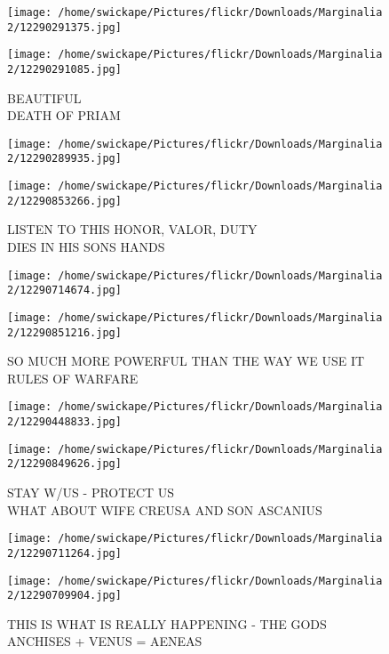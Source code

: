 \documentclass[10pt,letterpaper]{article}
\begin{document}
\texttt{[image: /home/swickape/Pictures/flickr/Downloads/Marginalia 2/12290291375.jpg]}

\vspace{0.25in}
\texttt{[image: /home/swickape/Pictures/flickr/Downloads/Marginalia 2/12290291085.jpg]}

BEAUTIFUL\\
DEATH OF PRIAM\\
\pagebreak

\texttt{[image: /home/swickape/Pictures/flickr/Downloads/Marginalia 2/12290289935.jpg]}

\vspace{0.25in}
\texttt{[image: /home/swickape/Pictures/flickr/Downloads/Marginalia 2/12290853266.jpg]}

LISTEN TO THIS HONOR, VALOR, DUTY\\
DIES IN HIS SONS HANDS\\
\pagebreak

\texttt{[image: /home/swickape/Pictures/flickr/Downloads/Marginalia 2/12290714674.jpg]}

\vspace{0.25in}
\texttt{[image: /home/swickape/Pictures/flickr/Downloads/Marginalia 2/12290851216.jpg]}

SO MUCH MORE POWERFUL THAN THE WAY WE USE IT\\
RULES OF WARFARE\\
\pagebreak

\texttt{[image: /home/swickape/Pictures/flickr/Downloads/Marginalia 2/12290448833.jpg]}

\vspace{0.25in}
\texttt{[image: /home/swickape/Pictures/flickr/Downloads/Marginalia 2/12290849626.jpg]}

STAY W/US {-} PROTECT US\\
WHAT ABOUT WIFE CREUSA AND SON ASCANIUS\\
\pagebreak

\texttt{[image: /home/swickape/Pictures/flickr/Downloads/Marginalia 2/12290711264.jpg]}

\vspace{0.25in}
\texttt{[image: /home/swickape/Pictures/flickr/Downloads/Marginalia 2/12290709904.jpg]}

THIS IS WHAT IS REALLY HAPPENING {-} THE GODS\\
ANCHISES + VENUS = AENEAS\\
\pagebreak
\end{document}
